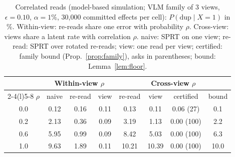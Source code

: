 \begin{table}[!htbp]
\centering
\caption{Correlated reads (model-based simulation; VLM family of 3 views, $\epsilon{=}0.10$, $\alpha{=}1\%$, 30{,}000 committed effects per cell): $P(\mathrm{dup}\mid X{=}1)$ in \%. Within-view: re-reads share one error with probability $\rho$. Cross-view: views share a latent rate with correlation $\rho$. naive: SPRT on one view; re-read: SPRT over rotated re-reads; view: one read per view; certified: family bound (Prop.~\ref{prop:family}), asks in parentheses; bound: Lemma~\ref{lem:floor}.}
\label{tab:corr}
\footnotesize
\setlength{\tabcolsep}{2pt}
\begin{tabular}{@{}c ccc cccc@{}}
\toprule
 & \multicolumn{3}{c}{Within-view $\rho$} & \multicolumn{4}{c}{Cross-view $\rho$} \\
\cmidrule(lr){2-4}\cmidrule(l){5-8}
$\rho$ & naive & re-read & view & re-read & view & certified & bound \\
\midrule
0.0 & 0.12 & 0.16 & 0.11 & 0.13 & 0.11 & 0.06 (27) & 0.1 \\
0.2 & 2.13 & 0.36 & 0.09 & 3.19 & 1.13 & 0.00 (100) & 2.2 \\
0.6 & 5.95 & 0.99 & 0.09 & 8.42 & 5.03 & 0.00 (100) & 6.3 \\
1.0 & 9.63 & 1.89 & 0.11 & 10.21 & 10.39 & 0.00 (100) & 10.0 \\
\bottomrule
\end{tabular}
\end{table}
